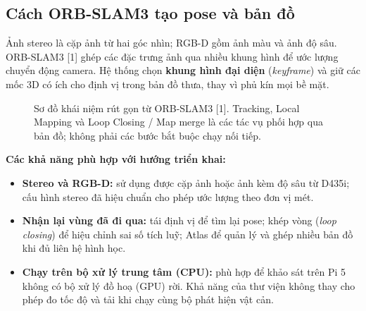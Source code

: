\documentclass[11pt,a4paper]{article}
\begin{document}
\newpage
\subsection*{Cách ORB-SLAM3 tạo pose và bản đồ}
Ảnh stereo là cặp ảnh từ hai góc nhìn; RGB-D gồm ảnh màu và ảnh độ sâu. ORB-SLAM3 [1] ghép các đặc trưng ảnh qua nhiều khung hình để ước lượng chuyển động camera. Hệ thống chọn \textbf{khung hình đại diện} (\emph{keyframe}) và giữ các mốc 3D có ích cho định vị trong bản đồ thưa, thay vì phủ kín mọi bề mặt.
\begin{figure}[H]\centering
{}
\caption{Sơ đồ khái niệm rút gọn từ ORB-SLAM3 [1]. Tracking, Local Mapping và Loop Closing / Map merge là các tác vụ phối hợp qua bản đồ; không phải các bước bắt buộc chạy nối tiếp.}
\end{figure}
\textbf{Các khả năng phù hợp với hướng triển khai:}
\begin{itemize}\setlength{\itemsep}{3pt}
\item \textbf{Stereo và RGB-D:} sử dụng được cặp ảnh hoặc ảnh kèm độ sâu từ D435i; cấu hình stereo đã hiệu chuẩn cho phép ước lượng theo đơn vị mét.
\item \textbf{Nhận lại vùng đã đi qua:} tái định vị để tìm lại pose; khép vòng (\emph{loop closing}) để hiệu chỉnh sai số tích luỹ; Atlas để quản lý và ghép nhiều bản đồ khi đủ liên hệ hình học.
\item \textbf{Chạy trên bộ xử lý trung tâm (CPU):} phù hợp để khảo sát trên Pi 5 không có bộ xử lý đồ hoạ (GPU) rời. Khả năng của thư viện không thay cho phép đo tốc độ và tải khi chạy cùng bộ phát hiện vật cản.
\end{itemize}
\end{document}
